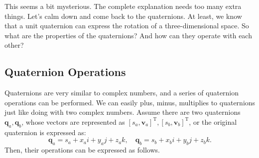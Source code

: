 This seems a bit mysterious. The complete explanation needs too many extra things. Let's calm down and come back to the quaternions. At least, we know that a unit quaternion can express the rotation of a three-dimensional space. So what are the properties of the quaternions? And how can they operate with each other?

\subsection{Quaternion Operations}
Quaternions are very similar to complex numbers, and a series of quaternion operations can be performed. We can easily plus, minus, multiplies to quaternions just like doing with two complex numbers. Assume there are two quaternions $ \mathbf{q}_a, \mathbf{q}_b $, whose vectors are represented as $ [s_a, \mathbf {v}_a]^ \mathrm {T}, [s_b, \mathbf{v}_b]^ \mathrm {T} $, or the original quaternion is expressed as:
\[
\mathbf{q} _a = s_a + x_ai + y_aj + z_ak, \quad  \mathbf {q} _b = s_b + x_bi + y_bj + z_bk.
\]
Then, their operations can be expressed as follows.


